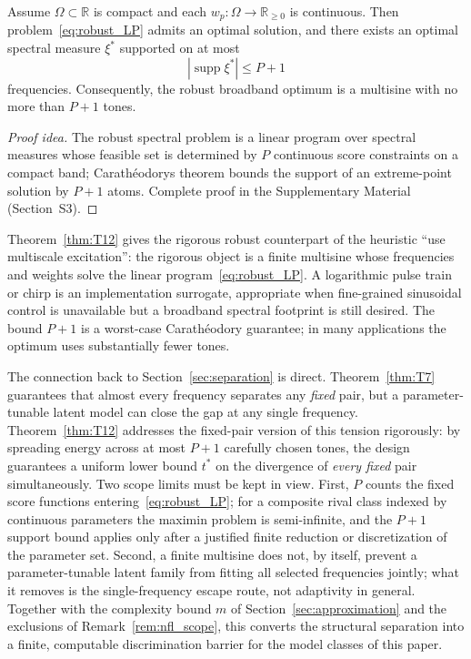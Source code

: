 \begin{theorem}
\label{thm:T12}
Assume \(\Omega \subset \mathbb{R}\) is compact and each \(w_p : \Omega \to \mathbb{R}_{\ge 0}\) is continuous. Then problem~\eqref{eq:robust_LP} admits an optimal solution, and there exists an optimal spectral measure \(\xi^{*}\) supported on at most
\begin{equation}
\boxed{
|\operatorname{supp} \xi^{*}| \le P + 1
}
\label{eq:T12_support}
\end{equation}
frequencies. Consequently, the robust broadband optimum is a multisine with no more than \(P+1\) tones.
\end{theorem}

\begin{proof}[Proof idea]
The robust spectral problem is a linear program over spectral measures whose feasible set is determined by $P$ continuous score constraints on a compact band; Carath\'eodory\textquotesingle s theorem bounds the support of an extreme-point solution by $P+1$ atoms. Complete proof in the Supplementary Material (Section~S3).
\end{proof}

\begin{remark}
Theorem~\ref{thm:T12} gives the rigorous robust counterpart of the heuristic ``use multiscale excitation'': the rigorous object is a finite multisine whose frequencies and weights solve the linear program~\eqref{eq:robust_LP}. A logarithmic pulse train or chirp is an implementation surrogate, appropriate when fine-grained sinusoidal control is unavailable but a broadband spectral footprint is still desired. The bound \(P+1\) is a worst-case Carath\'eodory guarantee; in many applications the optimum uses substantially fewer tones.
\end{remark}

The connection back to Section~\ref{sec:separation} is direct. Theorem~\ref{thm:T7} guarantees that almost every frequency separates any \emph{fixed} pair, but a parameter-tunable latent model can close the gap at any single frequency. Theorem~\ref{thm:T12} addresses the fixed-pair version of this tension rigorously: by spreading energy across at most \(P+1\) carefully chosen tones, the design guarantees a uniform lower bound \(t^{*}\) on the divergence of \emph{every fixed} pair simultaneously. Two scope limits must be kept in view. First, \(P\) counts the fixed score functions entering~\eqref{eq:robust_LP}; for a composite rival class indexed by continuous parameters the maximin problem is semi-infinite, and the \(P+1\) support bound applies only after a justified finite reduction or discretization of the parameter set. Second, a finite multisine does not, by itself, prevent a parameter-tunable latent family from fitting all selected frequencies jointly; what it removes is the single-frequency escape route, not adaptivity in general. Together with the complexity bound \(m\) of Section~\ref{sec:approximation} and the exclusions of Remark~\ref{rem:nfl_scope}, this converts the structural separation into a finite, computable discrimination barrier for the model classes of this paper.

